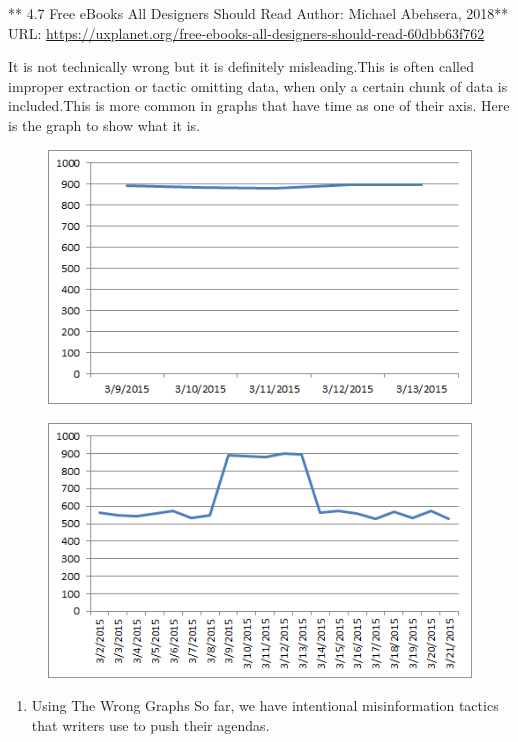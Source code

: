 \documentclass[]{book}
\providecommand{\tightlist}{%
  \setlength{\itemsep}{0pt}\setlength{\parskip}{0pt}}
\theoremstyle{definition}
\theoremstyle{definition}
\theoremstyle{definition}
\theoremstyle{remark}
\begin{document}
** 4.7 Free eBooks All Designers Should Read\textbf{ } Author: Michael
Abehsera, 2018** URL:
\url{https://uxplanet.org/free-ebooks-all-designers-should-read-60dbb63f762}

It is not technically wrong but it is definitely misleading.This is
often called improper extraction or tactic omitting data, when only a
certain chunk of data is included.This is more common in graphs that
have time as one of their axis. Here is the graph to show what it is.

\begin{figure}
\centering
\includegraphics{images/Bad_graph_extraction.png}
\caption{}
\end{figure}

\begin{figure}
\centering
\includegraphics{images/Good_graph_extraction.png}
\caption{}
\end{figure}

\begin{enumerate}
\def\labelenumi{\arabic{enumi}.}
\setcounter{enumi}{3}
\tightlist
\item
  Using The Wrong Graphs So far, we have intentional misinformation
  tactics that writers use to push their agendas.
\end{enumerate}
\end{document}
